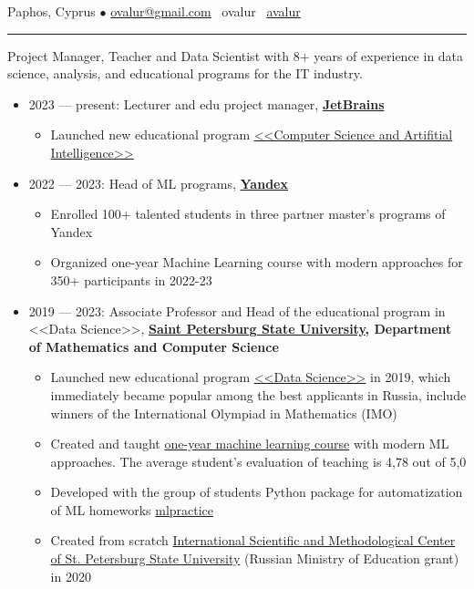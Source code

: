\documentclass[11pt]{article}
\begin{document}
%

\vspace{0.5em}

\noindent Paphos, Cyprus $\bullet$ \href{mailto:ovalur@gmail.com}{ovalur@gmail.com} \faSendO~ovalur
\faGithub~\href{https://github.com/avalur}{avalur}

\vspace{0.5em}
\hrule
\vspace{0.5em}

Project Manager, Teacher and Data Scientist with 8+ years of experience in data science, analysis, and educational programs for the IT industry.

\vspace{0.5em}
\begin{itemize}
	\item 2023 — present: Lecturer and edu project manager, \textbf{\href{https://jetbrains.com}{JetBrains}}
	\begin{itemize}
		\item Launched new educational program \href{https://blog.jetbrains.com/education/2023/05/03/introducing-the-computer-science-and-artificial-intelligence-bachelor-s-program-with-neapolis-university-paphos/}{<<Computer Science and Artifitial Intelligence>>}
	\end{itemize}
	\item 2022 — 2023:
	Head of ML programs, \textbf{\href{https://ya.ru/}{Yandex}}
	\begin{itemize}
		\item Enrolled 100+ talented students in three partner master's programs of Yandex
		\item Organized one-year Machine Learning course with modern approaches for 350+ participants in 2022-23
	\end{itemize}

 \item 2019 — 2023:
 Associate Professor and Head of the educational program in <<Data Science>>,  \textbf{\href{https://english.spbu.ru/}{Saint Petersburg State University}, Department of Mathematics and Computer Science}
 \begin{itemize}
	 \item Launched new educational program \href{https://maad.compscicenter.ru}{<<Data Science>>} in 2019, which immediately became popular among the best applicants in Russia, include winners of the International Olympiad in Mathematics (IMO)
	 \item Created and taught \href{https://github.com/spbu-math-cs/ml-course/}{one-year machine learning course} with modern ML approaches. The average student's evaluation of teaching is 4,78 out of 5,0
	 \item Developed with the group of students Python package for automatization of ML homeworks \href{https://github.com/avalur/mlpractice}{mlpractice}
	 \item Created from scratch \href{https://gsom.spbu.ru/all_news/event2020-11-28/}{International Scientific and Methodological Center of St. Petersburg State University} (Russian Ministry of Education grant) in 2020
 \end{itemize}


\end{itemize}
\end{document}
